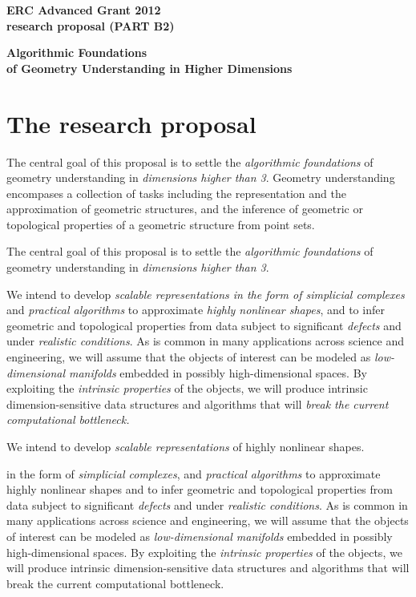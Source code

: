 \thispagestyle{empty}

\mbox{}\vspace{-3.5cm}

\begin{center}
{\Large
{\bf ERC Advanced Grant 2012 \\ research proposal (PART B2)}}
\vspace{1cm}

{\LARGE {\bf  Algorithmic Foundations \\ of 
Geometry Understanding in Higher Dimensions}

\vspace{3mm} 

}
\end{center}
\section{The research proposal}

The central goal of this proposal is to settle the {\em algorithmic
  foundations} of geometry understanding in {\em dimensions higher
  than 3}.  
Geometry understanding encompases a collection of tasks including the representation and the approximation of geometric structures, and  the  inference of geometric or topological properties
of a geometric structure  from point sets.


The central goal of this proposal is to settle the {\em algorithmic
foundations} of geometry understanding in {\em dimensions higher than
3}.  


We intend to develop {\em scalable representations in the form of simplicial complexes} and {\em
practical algorithms} to approximate {\em highly nonlinear shapes}, and to
infer geometric and topological properties from data subject to
significant {\em defects} and under {\em realistic conditions}.
As is common in many applications across science and engineering, we
will assume that the objects of interest can be modeled as {\em
  low-dimensional manifolds} embedded in possibly high-dimensional
spaces. By exploiting the {\em intrinsic properties} of the objects,
we will produce intrinsic dimension-sensitive data structures and algorithms
that will {\em break the current computational
bottleneck.}  

We intend to develop {\em scalable representations} of  highly nonlinear shapes.


in the
form of {\em simplicial complexes}, and {\em practical algorithms} to
approximate highly nonlinear shapes and to infer geometric and
topological properties from data subject to significant {\em defects}
and under {\em realistic conditions}.  As is common in many
applications across science and engineering, we will assume that the
objects of interest can be modeled as {\em low-dimensional manifolds}
embedded in possibly high-dimensional spaces. By exploiting the {\em
  intrinsic properties} of the objects, we will produce intrinsic
dimension-sensitive data structures and algorithms that will break the
current computational bottleneck. 



